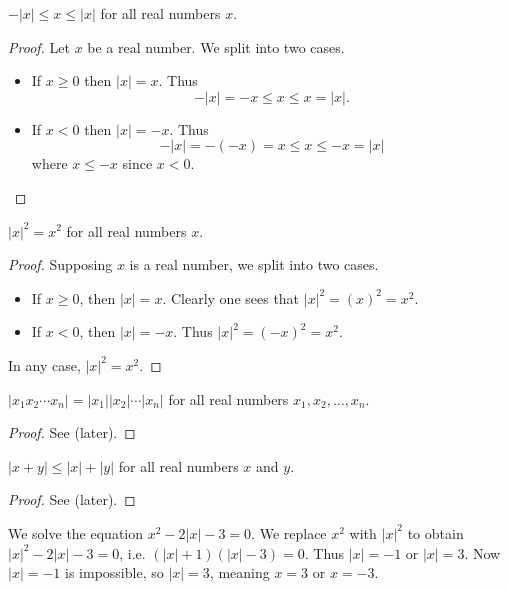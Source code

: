 \begin{proposition}
    $-|x| \leq x \leq |x|$ for all real numbers $x$.
\end{proposition}
\begin{proof}
    Let $x$ be a real number. We split into two cases.
    \begin{itemize}
        \item If $x \geq 0$ then $|x| = x$. Thus
        \[
            -|x| = -x \leq x \leq x = |x|.
        \]
        \item If $x < 0$ then $|x| = -x$. Thus
        \[
            -|x| = -(-x) = x \leq x \leq -x = |x|
        \]
        where $x \leq -x$ since $x < 0$.\qedhere
    \end{itemize}
\end{proof}

\begin{proposition}
    $|x|^2 = x^2$ for all real numbers $x$.
\end{proposition}
\begin{proof}
    Supposing $x$ is a real number, we split into two cases.
    \begin{itemize}
        \item If $x \geq 0$, then $|x| = x$. Clearly one sees that $|x|^2 = (x)^2 = x^2$.
        \item If $x < 0$, then $|x| = -x$. Thus $|x|^2 = (-x)^2 = x^2$.
    \end{itemize}
    In any case, $|x|^2 = x^2$.
\end{proof}

\begin{proposition}
    $|x_1x_2\cdots x_n| = |x_1||x_2|\cdots|x_n|$ for all real numbers $x_1, x_2, \dots, x_n$.
\end{proposition}
\begin{proof}
    See  (later).
\end{proof}

\begin{proposition}\label{prop-triangle-inequality}
    $|x + y| \leq |x| + |y|$ for all real numbers $x$ and $y$.
\end{proposition}
\begin{proof}
    See  (later).
\end{proof}

\begin{example}
    We solve the equation $x^2 - 2|x| - 3 = 0$. We replace $x^2$ with $|x|^2$ to obtain $|x|^2 - 2|x| - 3 = 0$, i.e. $(|x|+1)(|x|-3) = 0$. Thus $|x| = -1$ or $|x| = 3$. Now $|x| = -1$ is impossible, so $|x| = 3$, meaning $x = 3$ or $x = -3$.
\end{example}


